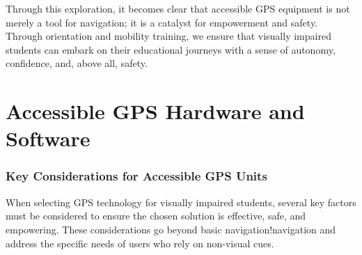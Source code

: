 Through this exploration, it becomes clear that accessible GPS equipment is not merely a tool for \gls{navigation}; it is a catalyst for empowerment and safety. Through \gls{orientation} and \gls{mobility} training, we ensure that visually impaired students can embark on their educational journeys with a sense of autonomy, confidence, and, above all, safety.

\section{Accessible GPS Hardware and Software}\label{ch8:sec:accessible-gps-hardware}

\subsubsection{Key Considerations for Accessible GPS Units}
When selecting GPS \gls{technology} for visually impaired students, several key factors must be considered to ensure the chosen solution is effective, safe, and empowering. These considerations go beyond basic navigation!navigation and address the specific needs of users who rely on non-visual cues.

